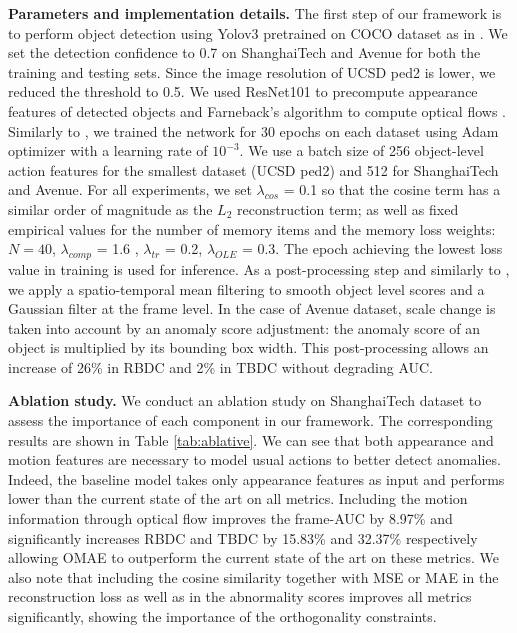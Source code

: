 \documentclass{article}
\begin{document}
\noindent\textbf{Parameters and implementation details.} \label{subsec:implementation} The first step of our framework is to perform object detection using Yolov3 \cite{yolov3} pretrained on COCO dataset as in \cite{ssmt,baf,dummyae}. We set the detection confidence to 0.7 on ShanghaiTech and Avenue for both the training and testing sets. Since the image resolution of UCSD ped2 is lower, we reduced the threshold to 0.5. We used ResNet101 to precompute appearance features of detected objects and Farneback's algorithm to compute optical flows \cite{farneback2003two}. Similarly to \cite{ssmt},  we trained the network for 30 epochs on each dataset using Adam optimizer with a learning rate of $10^{-3}$. We use a batch size of 256 object-level action features for the smallest dataset (UCSD ped2) and 512 for ShanghaiTech and Avenue. 
For all experiments, we set $\lambda_{cos}$ = 0.1 so that the cosine term has a similar order of magnitude as the $L_2$ reconstruction term;
as well as fixed empirical values for the number of memory items and the memory loss weights: $N = 40$, $\lambda_{comp}$ = 1.6 , $\lambda_{tr}$ = 0.2, $\lambda_{OLE}$ = 0.3. 
The epoch achieving the lowest loss value in training is used for inference. As a post-processing step and similarly to \cite{baf}, we apply a spatio-temporal mean filtering to smooth object level scores and a Gaussian filter at the frame level. In the case of Avenue dataset,
scale change is taken into account by an anomaly score adjustment: the anomaly score of an object is multiplied by its bounding box width. 
This post-processing allows an increase of 26\% in RBDC and 2\% in TBDC
without degrading AUC. 


\vspace{1mm}

\noindent\textbf{Ablation study.} We conduct an ablation study on ShanghaiTech dataset to assess the importance of each component in our framework. The corresponding results are shown in Table \ref{tab:ablative}. We can see that both appearance and motion features are necessary to model usual actions to better detect anomalies. Indeed, the baseline model takes only appearance features as input and performs lower than the current state of the art on all metrics. 
Including the motion information through optical flow improves the frame-AUC by 8.97\% and significantly increases RBDC and TBDC by 15.83\% and 32.37\% respectively allowing OMAE to outperform the current state of the art on these metrics. 
We also note that including the cosine similarity together with MSE or MAE in the reconstruction loss as well as in the abnormality scores improves all metrics significantly, showing the importance of the orthogonality constraints. 
\end{document}
